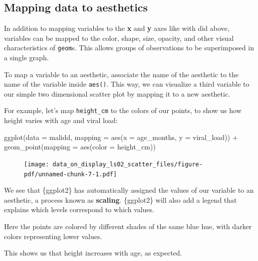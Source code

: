 \documentclass[
  letterpaper,
  DIV=11,
  numbers=noendperiod]{scrreprt}
\newenvironment{Shaded}{\begin{snugshade}}{\end{snugshade}}
\newcommand{\AttributeTok}[1]{\textcolor[rgb]{0.40,0.45,0.13}{#1}}
\newcommand{\FunctionTok}[1]{\textcolor[rgb]{0.28,0.35,0.67}{#1}}
\newcommand{\NormalTok}[1]{\textcolor[rgb]{0.00,0.23,0.31}{#1}}
\newcommand{\SpecialCharTok}[1]{\textcolor[rgb]{0.37,0.37,0.37}{#1}}
\begin{document}
\hypertarget{mapping-data-to-aesthetics}{%
\subsection{Mapping data to
aesthetics}\label{mapping-data-to-aesthetics}}

In addition to mapping variables to the \textbf{x} and \textbf{y} axes
like with did above, variables can be mapped to the color, shape, size,
opacity, and other visual characteristics of \texttt{geom}s. This allows
groups of observations to be superimposed in a single graph.

To map a variable to an aesthetic, associate the name of the aesthetic
to the name of the variable inside \texttt{aes()}. This way, we can
visualize a third variable to our simple two dimensional scatter plot by
mapping it to a new aesthetic.

For example, let's map \texttt{height\_cm} to the colors of our points,
to show us how height varies with age and viral load:

\begin{Shaded}
\begin{Highlighting}[]
\FunctionTok{ggplot}\NormalTok{(}\AttributeTok{data =}\NormalTok{ malidd, }
       \AttributeTok{mapping =} \FunctionTok{aes}\NormalTok{(}\AttributeTok{x =}\NormalTok{ age\_months, }
                     \AttributeTok{y =}\NormalTok{ viral\_load)) }\SpecialCharTok{+} 
  \FunctionTok{geom\_point}\NormalTok{(}\AttributeTok{mapping =} \FunctionTok{aes}\NormalTok{(}\AttributeTok{color =}\NormalTok{ height\_cm))}
\end{Highlighting}
\end{Shaded}

\begin{figure}[H]

{\centering \texttt{[image: data\_on\_display\_ls02\_scatter\_files/figure-pdf/unnamed-chunk-7-1.pdf]}

}

\end{figure}

We see that \{ggplot2\} has automatically assigned the values of our
variable to an aesthetic, a process known as \textbf{scaling}.
\{ggplot2\} will also add a legend that explains which levels correspond
to which values.

Here the points are colored by different shades of the same blue hue,
with darker colors representing lower values.

This shows us that height increases with age, as expected.
\end{document}
